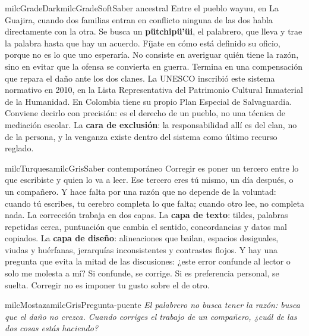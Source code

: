 \documentclass[11pt,letterpaper]{article}
\begin{document}
\begin{softbox}{milcGradeDark}{milcGradeSoft}{Saber ancestral}
Entre el pueblo wayuu, en La Guajira, cuando dos familias entran en conflicto ninguna de las dos habla directamente con la otra. Se busca un \textbf{pütchipü'üi}, el palabrero, que lleva y trae la palabra hasta que hay un acuerdo. Fíjate en cómo está definido su oficio, porque no es lo que uno esperaría. No consiste en averiguar quién tiene la razón, sino en evitar que la ofensa se convierta en guerra. Termina en una compensación que repara el daño ante los dos clanes. La UNESCO inscribió este sistema normativo en 2010, en la Lista Representativa del Patrimonio Cultural Inmaterial de la Humanidad. En Colombia tiene su propio Plan Especial de Salvaguardia. Conviene decirlo con precisión: es el derecho de un pueblo, no una técnica de mediación escolar. La \textbf{cara de exclusión}: la responsabilidad allí es del clan, no de la persona, y la venganza existe dentro del sistema como último recurso reglado.\par{}
\end{softbox}

\begin{softbox}{milcTurquesa}{milcGris}{Saber contemporáneo}
Corregir es poner un tercero entre lo que escribiste y quien lo va a leer. Ese tercero eres tú mismo, un día después, o un compañero. Y hace falta por una razón que no depende de la voluntad: cuando tú escribes, tu cerebro completa lo que falta; cuando otro lee, no completa nada. La corrección trabaja en dos capas. La \textbf{capa de texto}: tildes, palabras repetidas cerca, puntuación que cambia el sentido, concordancias y datos mal copiados. La \textbf{capa de diseño}: alineaciones que bailan, espacios desiguales, viudas y huérfanas, jerarquías inconsistentes y contrastes flojos. Y hay una pregunta que evita la mitad de las discusiones: ¿este error confunde al lector o solo me molesta a mí? Si confunde, se corrige. Si es preferencia personal, se suelta. Corregir no es imponer tu gusto sobre el de otro.
\end{softbox}

\begin{softbox}{milcMostaza}{milcGris}{Pregunta-puente}
\textit{El palabrero no busca tener la razón: busca que el daño no crezca. Cuando corriges el trabajo de un compañero, ¿cuál de las dos cosas estás haciendo?}
\end{softbox}
\end{document}
